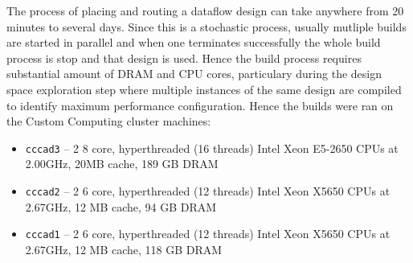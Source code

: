 \begin{comment}
Additionally, our approach targets a dataflow architecture as opposed
to the von Neumann architecture proposed in related work, which
typically includes a General-Purpose Processor (GPP) and a custom
accelerator. We consider additional optimisations to achieve
performance improvements as a result of a systematic design space
exploration process.

Compared to the MaxCompiler approach described in
\Cref{sec:back-maxcompiler}, the proposed design flow has a number of
benefits, the most exciting being the capability of capturing dataflow
designs using vanilla C and aspects. This is in direct contrast with
the meta-programming\cite{metaprogramming} approach used in
MaxCompiler which can be confusing to new users as suggested by many
queries on very basic matters from novice users on the Maxeler
Developer Forums\cite{mdx}. In addition, the MaxCompiler design
approach does not enable automating the design space exploration
process effectively. Because the dataflow design and run-time
component are written in different languages, integration with tools
for aspect weaving requires double the effort. The idea behind the
\FAST{} approach is to facilitate better integration with other tools
by providing a single language implementation. The reason behind using
meta-programming in MaxCompiler is to provide good support for design
parametrisation. In the \FAST{} approach this is achieved by
specifying optimisation strategies in the aspect descriptions,
simultaneously achieving the goals of decoupling optimisations form
application code and simplifying the programming model for dataflow
designs. This leads to improved productivity without affecting the
efficiency of the generated designs.
\end{comment}


The process of placing and routing a dataflow design can take anywhere
from 20 minutes to several days. Since this is a stochastic process,
usually mutliple builds are started in parallel and when one
terminates successfully the whole build process is stop and that
design is used. Hence the build process requires substantial amount of
DRAM and CPU cores, particulary during the design space exploration
step where multiple instances of the same design are compiled to
identify maximum performance configuration. Hence the builds were ran
on the Custom Computing cluster machines:

\begin{itemize}
\item \texttt{cccad3} -- 2 8 core, hyperthreaded (16 threads) Intel
  Xeon E5-2650 CPUs at 2.00GHz, 20MB cache, 189 GB DRAM
\item \texttt{cccad2} -- 2 6 core, hyperthreaded (12 threads) Intel
  Xeon X5650 CPUs at 2.67GHz, 12 MB cache, 94 GB DRAM
\item \texttt{cccad1} -- 2 6 core, hyperthreaded (12 threads) Intel Xeon
  X5650 CPUs at 2.67GHz, 12 MB cache, 118 GB DRAM
\end{itemize}


